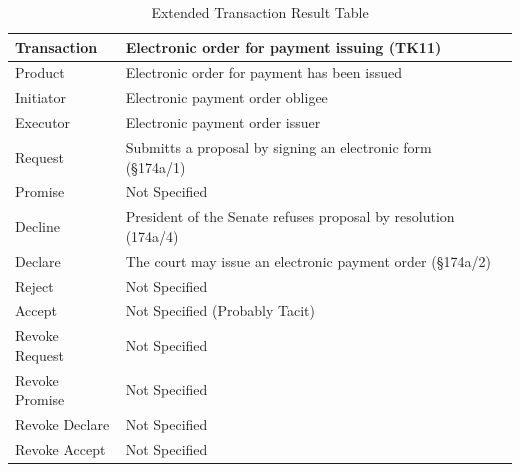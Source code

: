 \begin{landscape}
\begin{table}[h]
\caption{Extended Transaction Result Table}
\label{tab:etrt}
\begin{tabular}{|l||l|l|}
\hline
Transaction  &  Electronic order for payment issuing (TK11) \\ \hline
Product      &  Electronic order for payment has been issued \\ \hline
Initiator      & Electronic payment order obligee \\ \hline
Executor       &  Electronic payment order issuer \\ \hline
Request        & Submitts a proposal by signing an electronic form (\S174a/1)
  \\ \hline
Promise        &    Not Specified   \\ \hline
Decline        & President of the Senate refuses proposal by resolution (174a/4)  \\ \hline
Declare        &  The court may issue an electronic payment order (\S174a/2)  \\ \hline
Reject         &  Not Specified   \\ \hline
Accept         & Not Specified (Probably Tacit) \\ \hline
Revoke Request & Not Specified \\ \hline
Revoke Promise & Not Specified  \\ \hline
Revoke Declare & Not Specified      \\ \hline
Revoke Accept  &  Not Specified \\ \hline
\end{tabular}
\end{table}


\end{landscape}
